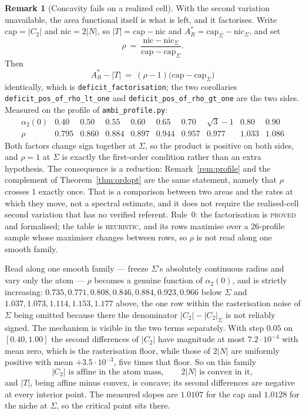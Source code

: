 \documentclass[11pt]{article}
\theoremstyle{definition}
\newtheorem{remark}[theorem]{Remark}
\newcommand{\Sig}{\Sigma}
\begin{document}
\begin{remark}[Concavity fails on a realized cell]
With the second variation unavailable, the area functional itself is what is left, and it
factorises. Write $\mathrm{cap}=|C_2|$ and $\mathrm{nic}=2|N|$, so $|T|=\mathrm{cap}-
\mathrm{nic}$ and $A_R^\ast=\mathrm{cap}_\Sig-\mathrm{nic}_\Sig$, and set
\[
  \rho\ =\ \frac{\mathrm{nic}-\mathrm{nic}_\Sig}{\mathrm{cap}-\mathrm{cap}_\Sig} .
\]
Then
\[
  A_R^\ast-|T|\ =\ (\rho-1)\bigl(\mathrm{cap}-\mathrm{cap}_\Sig\bigr)
\]
identically, which is \texttt{deficit\_factorisation}; the two corollaries
\texttt{deficit\_pos\_of\_rho\_lt\_one} and \texttt{deficit\_pos\_of\_rho\_gt\_one} are the
two sides. Measured on the profile of \texttt{ambi\_profile.py}:
\[
  \begin{array}{r|ccccccccc}
    \alpha_2(0) & 0.40 & 0.50 & 0.55 & 0.60 & 0.65 & 0.70 & \sqrt3-1 & 0.80 & 0.90\\\hline
    \rho & 0.795 & 0.860 & 0.884 & 0.897 & 0.944 & 0.957 & 0.977 & 1.033 & 1.086
  \end{array}
\]
Both factors change sign together at $\Sig$, so the product is positive on both sides, and
$\rho=1$ at $\Sig$ is exactly the first-order condition rather than an extra hypothesis.
The consequence is a reduction: Remark~\ref{rem:profile} and the complement of
Theorem~\ref{thm:ordopt} are the same statement, namely that $\rho$ crosses $1$ exactly
once. That is a comparison between two areas and the rates at which they move, not a
spectral estimate, and it does not require the realised-cell second variation that has no
verified referent. Rule~0: the factorisation is \textsc{proved} and formalised; the table
is \textsc{heuristic}, and its rows maximise over a $26$-profile sample whose maximiser
changes between rows, so $\rho$ is not read along one smooth family.

Read along one smooth family --- freeze $\Sig$'s absolutely continuous radius and vary only
the atom --- $\rho$ becomes a genuine function of $\alpha_2(0)$, and is strictly increasing:
$0.735,0.771,0.808,0.846,0.884,0.923,0.966$ below $\Sig$ and $1.037,1.073,1.114,1.153,1.177$
above, the one row within the rasterisation noise of $\Sig$ being omitted because there the
denominator $|C_2|-|C_2|_\Sig$ is not reliably signed. The
mechanism is visible in the two terms separately. With step $0.05$ on $[0.40,1.00]$ the
second differences of $|C_2|$ have magnitude at most $7.2\cdot10^{-4}$ with mean zero,
which is the rasterisation floor, while those of $2|N|$ are uniformly positive with mean
$+3.5\cdot10^{-3}$, five times that floor. So on this family
\[
  |C_2| \text{ is affine in the atom mass},\qquad 2|N| \text{ is convex in it},
\]
and $|T|$, being affine minus convex, is concave; its second differences are negative at
every interior point. The measured slopes are $1.0107$ for the cap and $1.0128$ for the
niche at $\Sig$, so the critical point sits there.


\end{remark}
\end{document}
